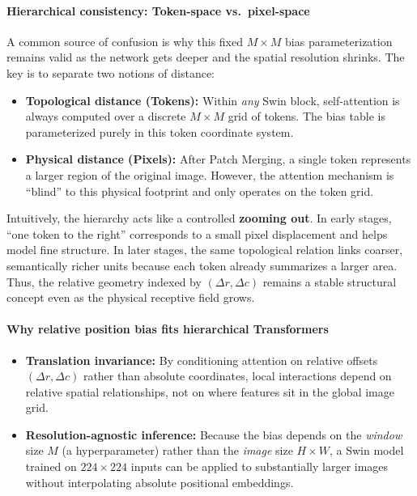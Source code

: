\paragraph{Hierarchical consistency: Token-space vs.\ pixel-space}
\noindent
A common source of confusion is why this fixed \(M \times M\) bias parameterization remains valid as the network gets deeper and the spatial resolution shrinks.
The key is to separate two notions of distance:
\begin{itemize}
	\item \textbf{Topological distance (Tokens):} Within \emph{any} Swin block, self-attention is always computed over a discrete \(M \times M\) grid of tokens. The bias table is parameterized purely in this token coordinate system.
	\item \textbf{Physical distance (Pixels):} After Patch Merging, a single token represents a larger region of the original image. However, the attention mechanism is ``blind'' to this physical footprint and only operates on the token grid.
\end{itemize}
Intuitively, the hierarchy acts like a controlled \textbf{zooming out}.
In early stages, ``one token to the right'' corresponds to a small pixel displacement and helps model fine structure.
In later stages, the same topological relation links coarser, semantically richer units because each token already summarizes a larger area.
Thus, the relative geometry indexed by \((\Delta r,\Delta c)\) remains a stable structural concept even as the physical receptive field grows.

\paragraph{Why relative position bias fits hierarchical Transformers}
\begin{itemize}
	\item \textbf{Translation invariance:} By conditioning attention on relative offsets \((\Delta r,\Delta c)\) rather than absolute coordinates, local interactions depend on relative spatial relationships, not on where features sit in the global image grid.
	\item \textbf{Resolution-agnostic inference:} Because the bias depends on the \emph{window} size \(M\) (a hyperparameter) rather than the \emph{image} size \(H \times W\), a Swin model trained on \(224 \times 224\) inputs can be applied to substantially larger images without interpolating absolute positional embeddings.
\end{itemize}

